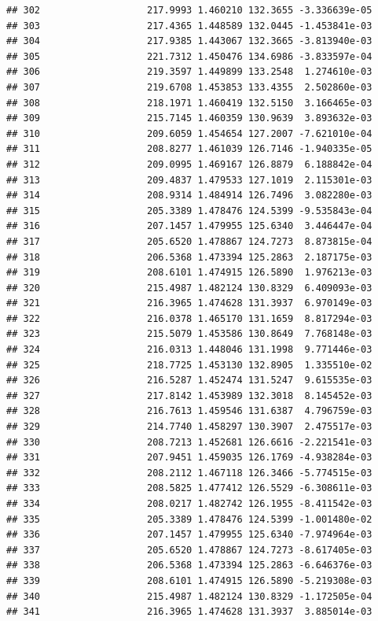\documentclass[
]{article}
\begin{document}
\begin{verbatim}
## 302                   217.9993 1.460210 132.3655 -3.336639e-05
## 303                   217.4365 1.448589 132.0445 -1.453841e-03
## 304                   217.9385 1.443067 132.3665 -3.813940e-03
## 305                   221.7312 1.450476 134.6986 -3.833597e-04
## 306                   219.3597 1.449899 133.2548  1.274610e-03
## 307                   219.6708 1.453853 133.4355  2.502860e-03
## 308                   218.1971 1.460419 132.5150  3.166465e-03
## 309                   215.7145 1.460359 130.9639  3.893632e-03
## 310                   209.6059 1.454654 127.2007 -7.621010e-04
## 311                   208.8277 1.461039 126.7146 -1.940335e-05
## 312                   209.0995 1.469167 126.8879  6.188842e-04
## 313                   209.4837 1.479533 127.1019  2.115301e-03
## 314                   208.9314 1.484914 126.7496  3.082280e-03
## 315                   205.3389 1.478476 124.5399 -9.535843e-04
## 316                   207.1457 1.479955 125.6340  3.446447e-04
## 317                   205.6520 1.478867 124.7273  8.873815e-04
## 318                   206.5368 1.473394 125.2863  2.187175e-03
## 319                   208.6101 1.474915 126.5890  1.976213e-03
## 320                   215.4987 1.482124 130.8329  6.409093e-03
## 321                   216.3965 1.474628 131.3937  6.970149e-03
## 322                   216.0378 1.465170 131.1659  8.817294e-03
## 323                   215.5079 1.453586 130.8649  7.768148e-03
## 324                   216.0313 1.448046 131.1998  9.771446e-03
## 325                   218.7725 1.453130 132.8905  1.335510e-02
## 326                   216.5287 1.452474 131.5247  9.615535e-03
## 327                   217.8142 1.453989 132.3018  8.145452e-03
## 328                   216.7613 1.459546 131.6387  4.796759e-03
## 329                   214.7740 1.458297 130.3907  2.475517e-03
## 330                   208.7213 1.452681 126.6616 -2.221541e-03
## 331                   207.9451 1.459035 126.1769 -4.938284e-03
## 332                   208.2112 1.467118 126.3466 -5.774515e-03
## 333                   208.5825 1.477412 126.5529 -6.308611e-03
## 334                   208.0217 1.482742 126.1955 -8.411542e-03
## 335                   205.3389 1.478476 124.5399 -1.001480e-02
## 336                   207.1457 1.479955 125.6340 -7.974964e-03
## 337                   205.6520 1.478867 124.7273 -8.617405e-03
## 338                   206.5368 1.473394 125.2863 -6.646376e-03
## 339                   208.6101 1.474915 126.5890 -5.219308e-03
## 340                   215.4987 1.482124 130.8329 -1.172505e-04
## 341                   216.3965 1.474628 131.3937  3.885014e-03

\end{verbatim}
\end{document}
